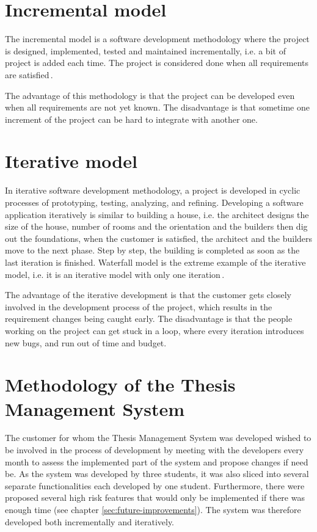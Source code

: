 \section{Incremental model}

The incremental model is a software development methodology where the project is designed, implemented, tested and maintained incrementally, i.e. a bit of project is added each time. The project is considered done when all requirements are satisfied\,\cite{agile-iterative-development}.

The advantage of this methodology is that the project can be developed even when all requirements are not yet known. The disadvantage is that sometime one increment of the project can be hard to integrate with another one.

\section{Iterative model}

In iterative software development methodology, a project is developed in cyclic processes of prototyping, testing, analyzing, and refining. Developing a software application iteratively is similar to building a house, i.e. the architect designs the size of the house, number of rooms and the orientation and the builders then dig out the foundations, when the customer is satisfied, the architect and the builders move to the next phase. Step by step, the building is completed as soon as the last iteration is finished. Waterfall model is the extreme example of the iterative model, i.e. it is an iterative model with only one iteration\,\cite{agile-iterative-development}.

The advantage of the iterative development is that the customer gets closely involved in the development process of the project, which results in the requirement changes being caught early. The disadvantage is that the people working on the project can get stuck in a loop, where every iteration introduces new bugs, and run out of time and budget.

\section{Methodology of the Thesis Management System}
\label{sec:tms-methodology}

The customer for whom the Thesis Management System was developed wished to be involved in the process of development by meeting with the developers every month to assess the implemented part of the system and propose changes if need be. As the system was developed by three students, it was also sliced into several separate functionalities each developed by one student. Furthermore, there were proposed several high risk features that would only be implemented if there was enough time (see chapter \ref{sec:future-improvements}). The system was therefore developed both incrementally and iteratively.